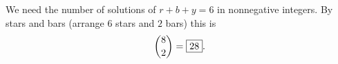 We need the number of solutions of $r+b+y=6$ in nonnegative integers. By stars and bars (arrange $6$ stars and $2$ bars) this is
\[
\dbinom{8}{2}=\boxed{28}.
\]
